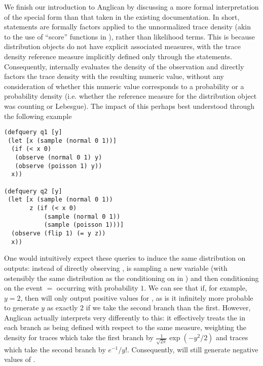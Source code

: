 We finish our introduction to Anglican by discussing a more formal
interpretation of the \observe special form than that taken
in the existing documentation.  In short, \observe statements are 
formally factors applied to the unnormalized 
trace density (akin to the use of
 ``score'' functions in
\citep{staton2016semantics}), rather than likelihood terms.  This is because
distribution objects do not have explicit associated measures, with the  trace density
reference measure implicitly defined only through
the \sample statements.  Consequently, \observe internally evaluates
the density of the observation and directly factors the trace density with the
resulting numeric value, without any consideration of whether this numeric value
corresponds to a probability or a probability density (i.e. whether the 
reference measure for the distribution object was counting or Lebesgue).
The impact of this perhaps best understood
through the following example
\vspace{-15pt}
\begin{lstlisting}[basicstyle=\ttfamily\footnotesize,multicols=2,frame=none]
(defquery q1 [y]
 (let [x (sample (normal 0 1))]
  (if (< x 0) 
   (observe (normal 0 1) y)
   (observe (poisson 1) y))
  x))
	
(defquery q2 [y]
 (let [x (sample (normal 0 1))
       z (if (< x 0)
           (sample (normal 0 1))
           (sample (poisson 1)))]
  (observe (flip 1) (= y z))
  x))
\end{lstlisting}\vspace{-15pt}
One would intuitively expect these queries to induce the same distribution on outputs: 
instead of directly observing ,  is sampling a new variable  (with
ostensibly the same distribution as the conditioning on  in )
and then conditioning on the event $=$ occurring with probability $1$. 
We can
see that if, for example, $y=2$, then  will only output positive values for
, as is it infinitely more probable to generate
$y$ as exactly $2$ if we take the second branch than the first.  
However, Anglican actually interprets
 very differently to this: it effectively 
treats the \observe in each branch as being defined with respect to the same
measure,
weighting the density for traces which take the first branch by $\frac{1}{\sqrt{2\pi}}\exp\left(-y^2/2\right)$ and traces which take the second
branch by $e^{-1}/y!$.  Consequently,  will still generate negative values of
.

